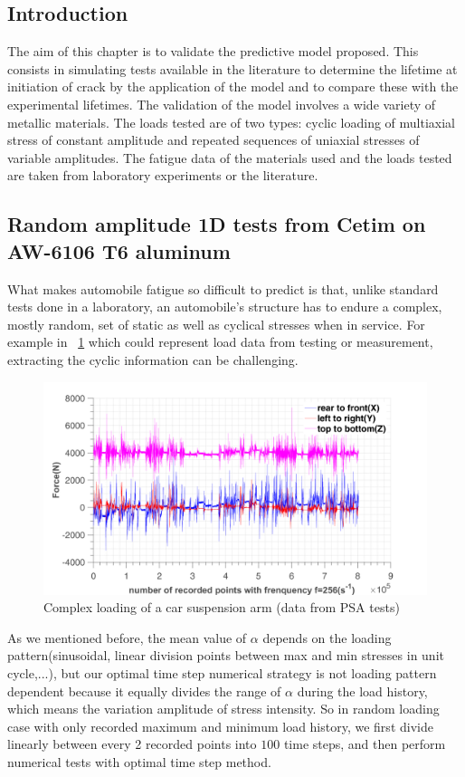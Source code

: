 \documentclass[3p,times,procedia,number]{elsarticle}
\newcommand{\figref}[1]{\figurename~\ref{#1}}
\begin{document}
\subsection{Introduction}
The aim of this chapter is to validate the predictive model proposed. This consists in simulating tests available in the literature to determine the lifetime at initiation of crack by the application of the model and to compare these with the experimental lifetimes. The validation of the model involves a wide variety of metallic materials. The loads tested are of two types: cyclic loading of multiaxial stress of constant amplitude and repeated sequences of uniaxial stresses of variable amplitudes. The fatigue data of the materials used and the loads tested are taken from laboratory experiments or the literature.

\subsection{Random amplitude 1D tests from Cetim on AW-6106 T6 aluminum}

What makes automobile fatigue so difficult to predict is that, unlike standard tests done in a laboratory, an automobile's structure has to endure a complex, mostly random, set of static as well as cyclical stresses when in service. For example in \figref{complexloading} which could represent load data from testing or measurement, extracting the cyclic information can be challenging. 
\begin{figure}[!h]
	\centering
	\includegraphics[width=\textwidth]{figures//xyz_suspension.png} 
	\caption{Complex loading of a car suspension arm (data from PSA tests)}
	\label{complexloading}
\end{figure}

As we mentioned before, the mean value of $\alpha$ depends on the loading pattern(sinusoidal, linear division points between max and min stresses in unit cycle,...), but our optimal time step numerical strategy is not loading pattern dependent because it equally divides the range of $\alpha$ during the load history, which means the variation amplitude of stress intensity. So in random loading case with only recorded maximum and minimum load history, we first divide linearly between every 2 recorded points into $100$ time steps, and then perform numerical tests with optimal time step method.
\end{document}
